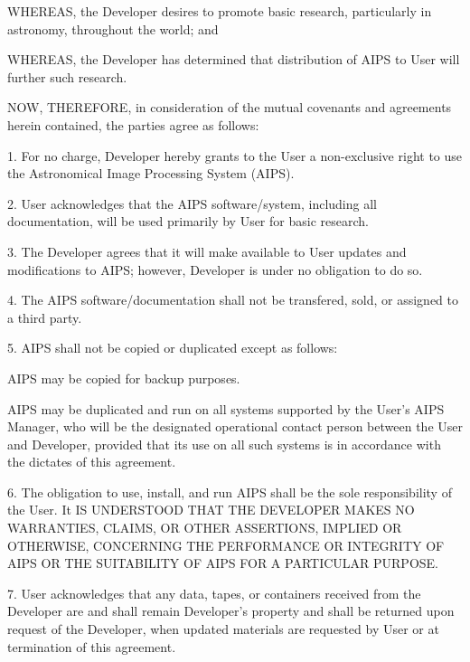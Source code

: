      WHEREAS, the Developer desires to promote basic research,
particularly in astronomy, throughout the world; and
\vskip 0.2in

     WHEREAS, the Developer has determined that distribution of AIPS
to User will further such research.
\vskip 0.2in

NOW, THEREFORE, in consideration of the mutual covenants and
agreements herein contained, the parties agree as follows:
\vskip 0.2in

\item{1.} For no charge, Developer hereby grants to the User a
non-exclusive right to use the Astronomical Image Processing System
(AIPS).\parskip 5pt

\item{2.}  User acknowledges that the AIPS software/system, including
all documentation, will be used primarily by User for basic research.

\item{3.}  The Developer agrees that it will make available to User
updates and modifications to AIPS; however, Developer is under no
obligation to do so.

\item{4.}  The AIPS software/documentation shall not be transfered,
sold, or assigned to a third party.

\item{5.}  AIPS shall not be copied or duplicated except as
follows:

 AIPS may be copied for backup purposes.

 AIPS may be duplicated and run on all systems supported
by the User's AIPS Manager, who will be the designated operational
contact person between the User and Developer, provided that its use
on all such systems is in accordance with the dictates of this agreement.

\item{6.}  The obligation to use, install, and run AIPS shall be the
sole responsibility of the User.  It IS UNDERSTOOD THAT THE DEVELOPER
MAKES NO WARRANTIES, CLAIMS, OR OTHER ASSERTIONS, IMPLIED OR
OTHERWISE, CONCERNING THE PERFORMANCE OR INTEGRITY OF AIPS OR THE
SUITABILITY OF AIPS FOR A PARTICULAR PURPOSE.


\item{7.}  User acknowledges that any data, tapes, or containers
received from the Developer are and shall remain Developer's property
and shall be returned upon request of the Developer, when updated
materials are requested by User or at termination of this agreement.


